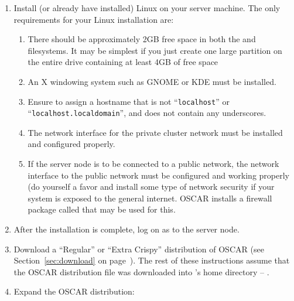 \begin {enumerate}
\item Install (or already have installed) Linux on your server
  machine.  The only requirements for your Linux installation are:

  \begin{enumerate}
  \item There should be approximately 2GB free space in both the
    \file{/} and  filesystems. It may be simplest if you
    just create one large partition on the entire drive containing at
    least 4GB of free space
    
  \item An X windowing system such as GNOME or KDE must be installed.

\begchange
    
\item Ensure to assign a hostname that is not ``{\tt localhost}'' or
  ``{\tt localhost.localdomain}'', and does not contain any
  underscores.
    
  \item The network interface for the private cluster network must be
    installed and configured properly.
    
  \item If the server node is to be connected to a public network, the
    network interface to the public network must be configured and
    working properly (do yourself a favor and install some type of
    network security if your system is exposed to the general
    internet. OSCAR installs a firewall package called
     that may be used for this.

\endchange

  \end{enumerate}
  
  
\item After the installation is complete, log on as  to the
  server node.
  
\item Download a ``Regular'' or ``Extra Crispy'' distribution of OSCAR
  (see Section~\ref{sec:download} on page~\pageref{sec:download}).
  The rest of these instructions assume that the OSCAR distribution
  file was downloaded into 's home directory --
  .

\item Expand the OSCAR distribution:


\end{enumerate}
